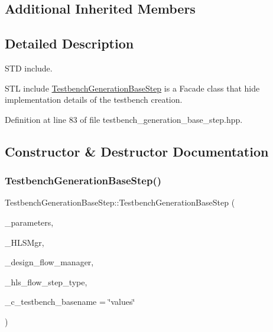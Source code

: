\subsection*{Additional Inherited Members}


\subsection{Detailed Description}
S\+TD include. 

S\+TL include \hyperlink{classTestbenchGenerationBaseStep}{Testbench\+Generation\+Base\+Step} is a Facade class that hide implementation details of the testbench creation. 

Definition at line 83 of file testbench\+\_\+generation\+\_\+base\+\_\+step.\+hpp.



\subsection{Constructor \& Destructor Documentation}
\mbox{\label{classTestbenchGenerationBaseStep_ab6735269f9e989952695c74d9d982ff6}} 
\subsubsection{\texorpdfstring{Testbench\+Generation\+Base\+Step()}{TestbenchGenerationBaseStep()}}
{\footnotesize\ttfamily Testbench\+Generation\+Base\+Step\+::\+Testbench\+Generation\+Base\+Step (\begin{DoxyParamCaption}\item[{const \hyperlink{Parameter_8hpp_a37841774a6fcb479b597fdf8955eb4ea}{Parameter\+Const\+Ref}}]{\+\_\+parameters,  }\item[{const \hyperlink{hls__manager_8hpp_acd3842b8589fe52c08fc0b2fcc813bfe}{H\+L\+S\+\_\+manager\+Ref}}]{\+\_\+\+H\+L\+S\+Mgr,  }\item[{const Design\+Flow\+Manager\+Const\+Ref}]{\+\_\+design\+\_\+flow\+\_\+manager,  }\item[{const \hyperlink{hls__step_8hpp_ada16bc22905016180e26fc7e39537f8d}{H\+L\+S\+Flow\+Step\+\_\+\+Type}}]{\+\_\+hls\+\_\+flow\+\_\+step\+\_\+type,  }\item[{std\+::string}]{\+\_\+c\+\_\+testbench\+\_\+basename = {\ttfamily \char`\"{}values\char`\"{}} }\end{DoxyParamCaption})\hspace{0.3cm}{\ttfamily [protected]}}



